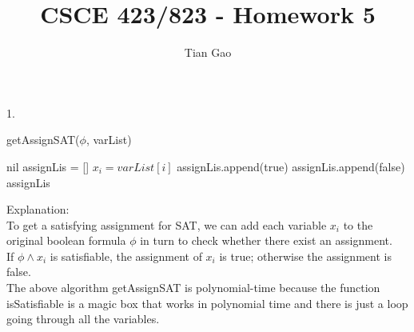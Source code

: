 \documentclass[a4paper]{article}
\title{CSCE 423/823 - Homework 5}
\author{Tian Gao}
\begin{document}
\maketitle

1.\\
\begin{algorithm}[H]
    \caption{getAssignSAT($\phi$, varList)}
    {
        \Return nil\;
    }
    assignLis = []\;
    {
        $x_i = varList[i]$\;
        {
            assignLis.append(true)\;
        }
        \Else
        {
            assignLis.append(false)\;
        }
    }
    \Return assignLis\;
\end{algorithm}

Explanation:\\
To get a satisfying assignment for SAT, we can add each variable $x_i$ to the original boolean formula $\phi$ in turn to check whether there exist an assignment.\\
If $\phi \wedge x_i$ is satisfiable, the assignment of $x_i$ is true; otherwise the assignment is false.\\
The above algorithm getAssignSAT is polynomial-time because the function isSatisfiable is a magic box that works in polynomial time and there is just a loop going through all the variables.\\ 
\end{document}
